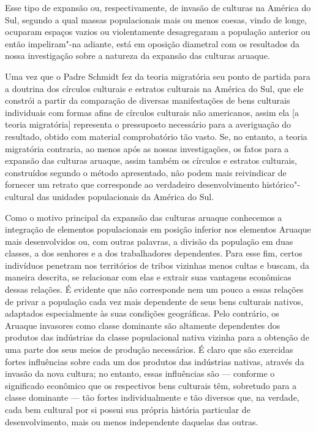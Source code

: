 Esse tipo de expansão ou, respectivamente, de invasão de culturas na
América do Sul, segundo a qual massas populacionais mais ou menos
coesas, vindo de longe, ocuparam espaços vazios ou violentamente
desagregaram a população anterior ou então impeliram"-na adiante, está em
oposição diametral com os resultados da nossa investigação sobre a
natureza da expansão das culturas aruaque.

Uma vez que o Padre Schmidt fez da teoria migratória seu ponto de
partida para a doutrina dos círculos culturais e estratos culturais na
América do Sul, que ele constrói a partir da comparação de diversas
manifestações de bens culturais individuais com formas afins de
círculos culturais não americanos, assim ela {[}a teoria migratória{]}
representa o pressuposto necessário para a averiguação do resultado,
obtido com material comprobatório tão vasto. Se, no entanto, a teoria
migratória contraria, ao menos após as nossas investigações, os fatos
para a expansão das culturas aruaque, assim também os círculos e
estratos culturais, construídos segundo o método apresentado, não podem
mais reivindicar de fornecer um retrato que corresponde ao verdadeiro
desenvolvimento histórico"-cultural das unidades populacionais da América
do Sul.

Como o motivo principal da expansão das culturas aruaque conhecemos a
integração de elementos populacionais em posição inferior nos elementos
Aruaque mais desenvolvidos ou, com outras palavras, a divisão da
população em duas classes, a dos senhores e a dos trabalhadores
dependentes. Para esse fim, certos indivíduos penetram nos territórios
de tribos vizinhas menos cultas e buscam, da maneira descrita, se
relacionar com elas e extrair suas vantagens econômicas dessas relações.
É evidente que não corresponde nem um pouco a essas relações de privar
a população cada vez mais dependente de seus bens culturais nativos,
adaptados especialmente às suas condições geográficas. Pelo contrário,
os Aruaque invasores como classe dominante são altamente dependentes
dos produtos das indústrias da classe populacional nativa vizinha para
a obtenção de uma parte dos seus meios de produção necessários. É claro
que são exercidas fortes influências sobre cada um dos produtos das
indústrias nativas, através da invasão da nova cultura; no entanto,
essas influências são --- conforme o significado econômico que os
respectivos bens culturais têm, sobretudo para a classe dominante --- tão
fortes individualmente e tão diversos que, na verdade, cada bem cultural
por si possui sua própria história particular de desenvolvimento, mais
ou menos independente daquelas das outras.

